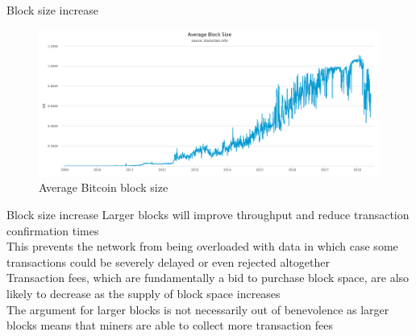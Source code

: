 \documentclass[11pt]{beamer}
\begin{document}
\begin{frame}{Block size increase}
	\begin{figure}[]
		\centering
		\includegraphics  [scale=0.25]{Images/average-block-size}
		\caption{Average Bitcoin block size}
	\end{figure}
\end{frame}


\begin{frame}{Block size increase}
	Larger blocks will improve throughput and reduce transaction confirmation times \\ \vspace{3mm}
	This prevents the network from being overloaded with data in which case some transactions could be severely delayed or even rejected altogether\\ \vspace{3mm}
	Transaction fees, which are fundamentally a bid to purchase block space, are also likely to decrease as the supply of block space increases\\ \vspace{3mm}
	The argument for larger blocks is not necessarily out of benevolence as larger blocks means that miners are able to collect more transaction fees \\ \vspace{3mm}
\end{frame}

\end{document}
